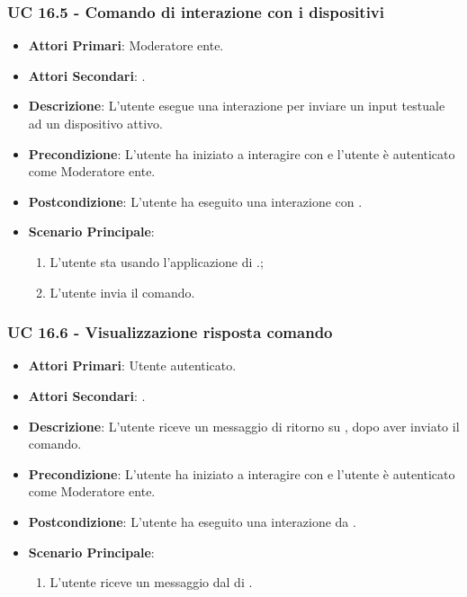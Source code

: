 	\subsubsection{UC 16.5 - Comando di interazione con i dispositivi}

	\begin{itemize}
		\item \textbf{Attori Primari}: Moderatore ente.
		\item \textbf{Attori Secondari}: .
		\item \textbf{Descrizione}: L'utente esegue una interazione per inviare un input testuale ad un dispositivo attivo. 
		\item \textbf{Precondizione}: L'utente ha iniziato a interagire con  e l'utente è autenticato come Moderatore ente.
		\item \textbf{Postcondizione}: L'utente ha eseguito una interazione con .
		\item \textbf{Scenario Principale}:
		\begin{enumerate}
			\item L'utente sta usando l'applicazione di .;
			\item L'utente invia il comando.
		\end{enumerate}
	\end{itemize}


	\subsubsection{UC 16.6 - Visualizzazione risposta comando }

	\begin{itemize}
		\item \textbf{Attori Primari}: Utente autenticato.
		\item \textbf{Attori Secondari}: .
		\item \textbf{Descrizione}: L'utente riceve un messaggio di ritorno su , dopo aver inviato il comando.
		\item \textbf{Precondizione}: L'utente ha iniziato a interagire con  e l'utente è autenticato come Moderatore ente.
		\item \textbf{Postcondizione}:  L'utente ha eseguito una interazione da .
		\item \textbf{Scenario Principale}:
		\begin{enumerate}
			\item L'utente riceve un messaggio dal  di .
		\end{enumerate}
	\end{itemize}

